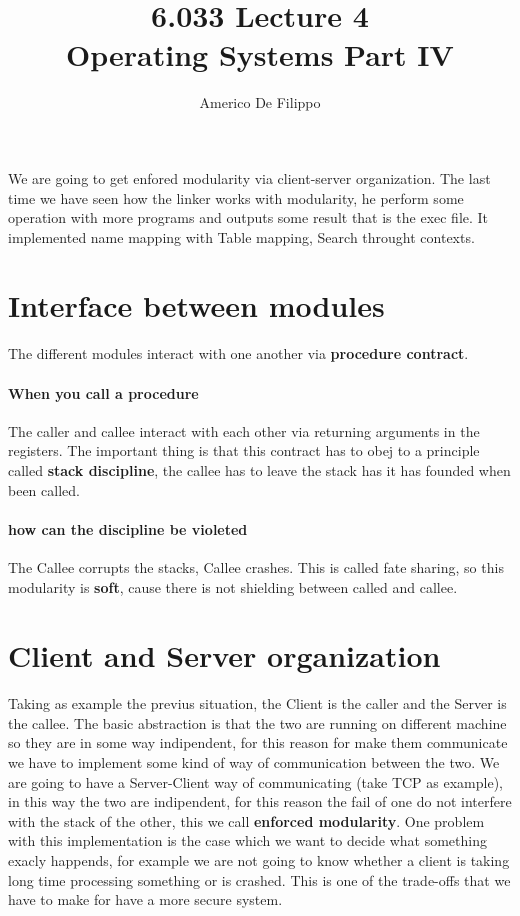 \documentclass{article}
\title{6.033 Lecture 4 \\ Operating Systems Part IV}
\author{Americo De Filippo}
\begin{document}
 
  \maketitle
  We are going to get enfored modularity via client-server organization.
  The last time we have seen how the linker works with modularity, 
  he perform some operation with more programs and outputs some result
  that is the exec file. It implemented name mapping with Table mapping, 
  Search throught contexts.
  \section{Interface between modules}
    The different modules interact with one another via \textbf{procedure contract}.
    \paragraph{When you call a procedure} The caller and callee interact with each other 
      via returning arguments in the registers. The important thing is that this contract
      has to obej to a principle called \textbf{stack discipline}, the callee has to leave
      the stack has it has founded when been called.
    \paragraph{how can the discipline be violeted} The Callee corrupts the stacks, Callee
      crashes. This is called fate sharing, so this modularity is \textbf{soft}, cause there
      is not shielding between called and callee.
  \section{Client and Server organization}
    Taking as example the previus situation, the Client is the caller and the Server is 
    the callee. The basic abstraction is that the two are running on different machine so
    they are in some way indipendent, for this reason for make them communicate we have to 
    implement some kind of way of communication between the two. We are going to have a 
    Server-Client way of communicating (take TCP as example), in this way the two are 
    indipendent, for this reason the fail of one do not interfere with the stack of the 
    other, this we call \textbf{enforced modularity}. One problem with this implementation
    is the case which we want to decide what something exacly happends, for example we 
    are not going to know whether a client is taking long time processing something or
    is crashed. This is one of the trade-offs that we have to make for have a more 
    secure system.
\end{document}
